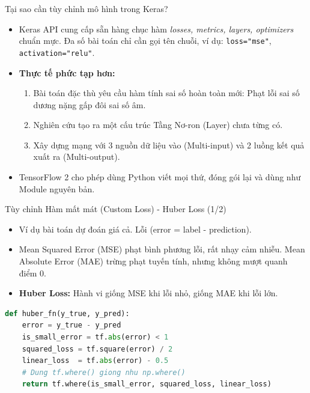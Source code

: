 \documentclass[aspectratio=169]{beamer}
\begin{document}
\begin{frame}{Tại sao cần tùy chỉnh mô hình trong Keras?}
    \begin{itemize}
        \item Keras API cung cấp sẵn hàng chục hàm \textit{losses, metrics, layers, optimizers} chuẩn mực. Đa số bài toán chỉ cần gọi tên chuỗi, ví dụ: \texttt{loss="mse"}, \texttt{activation="relu"}.
        \item \textbf{Thực tế phức tạp hơn:}
        \begin{enumerate}
            \item Bài toán đặc thù yêu cầu hàm tính sai số hoàn toàn mới: Phạt lỗi sai số dương nặng gấp đôi sai số âm.
            \item Nghiên cứu tạo ra một cấu trúc Tầng Nơ-ron (Layer) chưa từng có.
            \item Xây dựng mạng với 3 nguồn dữ liệu vào (Multi-input) và 2 luồng kết quả xuất ra (Multi-output).
        \end{enumerate}
        \item TensorFlow 2 cho phép dùng Python viết mọi thứ, đóng gói lại và dùng như Module nguyên bản.
    \end{itemize}
\end{frame}

\begin{frame}[fragile]{Tùy chỉnh Hàm mất mát (Custom Loss) - Huber Loss (1/2)}
    \begin{itemize}
        \item Ví dụ bài toán dự đoán giá cả. Lỗi (error = label - prediction). 
        \item Mean Squared Error (MSE) phạt bình phương lỗi, rất nhạy cảm nhiễu. Mean Absolute Error (MAE) trừng phạt tuyến tính, nhưng không mượt quanh điểm 0.
        \item \textbf{Huber Loss:} Hành vi giống MSE khi lỗi nhỏ, giống MAE khi lỗi lớn. 
    \end{itemize}
    \begin{lstlisting}[language=Python]
def huber_fn(y_true, y_pred):
    error = y_true - y_pred
    is_small_error = tf.abs(error) < 1
    squared_loss = tf.square(error) / 2
    linear_loss  = tf.abs(error) - 0.5
    # Dung tf.where() giong nhu np.where()
    return tf.where(is_small_error, squared_loss, linear_loss)
    \end{lstlisting}
\end{frame}
\end{document}
